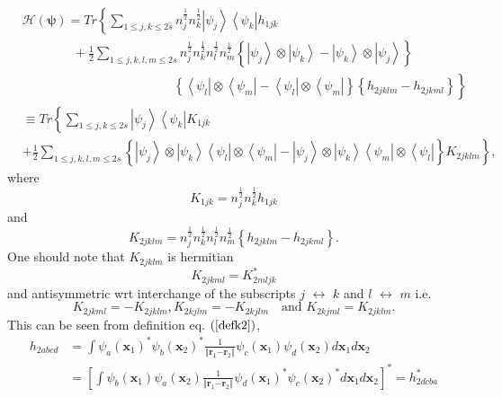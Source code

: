 \documentclass[aps,preprint]{revtex4}%
\begin{document}
\begin{align}
&  \mathcal{H}\left(  \mathbf{\psi}\right)  =Tr\left\{  \sum_{1\leq j,k\leq
2s}n_{j}^{\frac{1}{2}}n_{k}^{\frac{1}{2}}\left\vert \psi_{j}\right\rangle
\left\langle \psi_{k}\right\vert h_{1jk}\right. \nonumber\\
&  \qquad\qquad+\frac{1}{2}\sum_{1\leq j,k,l,m\leq2s}n_{j}^{\frac{1}{2}}%
n_{k}^{\frac{1}{2}}n_{l}^{\frac{1}{2}}n_{m}^{\frac{1}{2}}\left\{  \left\vert
\psi_{j}\right\rangle \otimes\left\vert \psi_{k}\right\rangle -\left\vert
\psi_{k}\right\rangle \otimes\left\vert \psi_{j}\right\rangle \right\}
\nonumber\\
&  \qquad\qquad\qquad\qquad\qquad\qquad\left.  \overset{}{\left\{
\left\langle \psi_{l}\right\vert \otimes\left\langle \psi_{m}\right\vert
-\left\langle \psi_{l}\right\vert \otimes\left\langle \psi_{m}\right\vert
\right\}  \left\{  h_{2jklm}-h_{2jkml}\right\}  }\right\} \nonumber\\
&  \equiv Tr\left\{  \sum_{1\leq j,k\leq2s}\left\vert \psi_{j}\right\rangle
\left\langle \psi_{k}\right\vert K_{1jk}\right. \nonumber\\
&  +\left.  \frac{1}{2}\sum_{1\leq j,k,l,m\leq2s}\left\{  \left\vert \psi
_{j}\right\rangle \otimes\left\vert \psi_{k}\right\rangle \left\langle
\psi_{l}\right\vert \otimes\left\langle \psi_{m}\right\vert -\left\vert
\psi_{j}\right\rangle \otimes\left\vert \psi_{k}\right\rangle \left\langle
\psi_{m}\right\vert \otimes\left\langle \psi_{l}\right\vert \right\}
K_{2jklm}\right\}  ,
\end{align}
where
\begin{equation}
K_{1jk}=n_{j}^{\frac{1}{2}}n_{k}^{\frac{1}{2}}h_{1jk}%
\end{equation}
and
\begin{equation}
K_{2jklm}=n_{j}^{\frac{1}{2}}n_{k}^{\frac{1}{2}}n_{l}^{\frac{1}{2}}%
n_{m}^{\frac{1}{2}}\left\{  h_{2jklm}-h_{2jkml}\right\}  . \label{defk2}%
\end{equation}
One should note that $K_{2jklm}$ is hermitian
\begin{equation}
K_{2jkml}=K_{2mljk}^{\ast}%
\end{equation}
and antisymmetric wrt interchange of the subscripts $j$ $\leftrightarrow$ $k$
and $l$ $\leftrightarrow$ $m$ i.e.
\begin{equation}
K_{2jkml}=-K_{2jklm},K_{2kjlm}=-K_{2kjlm}\quad\text{and }K_{2kjml}=K_{2jklm}.
\end{equation}
This can be seen from definition eq. $\left(  \ref{defk2}\right)  $,
\begin{align}
h_{2abcd}  &  =\int\psi_{a}\left(  \mathbf{x}_{1}\right)  ^{\ast}\psi
_{b}\left(  \mathbf{x}_{2}\right)  ^{\ast}\frac{1}{\left\Vert \mathbf{r}%
_{1}\mathbf{-r}_{2}\right\Vert }\psi_{c}\left(  \mathbf{x}_{1}\right)
\psi_{d}\left(  \mathbf{x}_{2}\right)  d\mathbf{x}_{1}d\mathbf{x}%
_{2}\nonumber\\
&  =\left[  \int\psi_{b}\left(  \mathbf{x}_{1}\right)  \psi_{a}\left(
\mathbf{x}_{2}\right)  \frac{1}{\left\Vert \mathbf{r}_{1}\mathbf{-r}%
_{2}\right\Vert }\psi_{d}\left(  \mathbf{x}_{1}\right)  ^{\ast}\psi_{c}\left(
\mathbf{x}_{2}\right)  ^{\ast}d\mathbf{x}_{1}d\mathbf{x}_{2}\right]  ^{\ast
}=h_{2dcba}^{\ast}%
\end{align}
\end{document}
